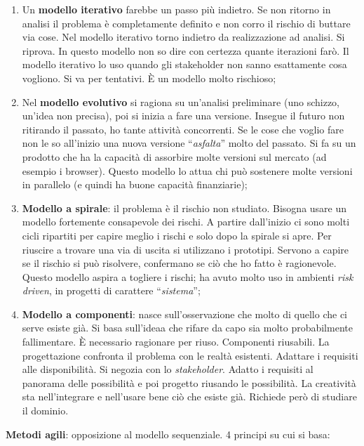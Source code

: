 \begin{enumerate}
	\item Un \textbf{modello iterativo} farebbe un passo più indietro. Se non ritorno in analisi il problema è completamente definito e non corro il rischio di buttare via cose. Nel modello iterativo torno indietro da realizzazione ad analisi. Si riprova. In questo modello non so dire con certezza quante iterazioni farò. Il modello iterativo lo uso quando gli stakeholder non sanno esattamente cosa vogliono. Si va per tentativi. È un modello molto rischioso;
	
	\item Nel \textbf{modello evolutivo} si ragiona su un'analisi preliminare (uno schizzo, un'idea non precisa), poi si inizia a fare una versione. Insegue il futuro non ritirando il passato, ho tante attività concorrenti. Se le cose che voglio fare non le so all'inizio una nuova versione ``\textit{asfalta}'' molto del passato. Si fa su un prodotto che ha la capacità di assorbire molte versioni sul mercato (ad esempio i browser). Questo modello lo attua chi può sostenere molte versioni in parallelo (e quindi ha buone capacità finanziarie);
	
	\item \textbf{Modello a spirale}: il problema è il rischio non studiato. Bisogna usare un modello fortemente consapevole dei rischi. A partire dall'inizio ci sono molti cicli ripartiti per capire meglio i rischi e solo dopo la spirale si apre. Per riuscire a trovare una via di uscita si utilizzano i prototipi. Servono a capire se il rischio si può risolvere, confermano se ciò che ho fatto è ragionevole. Questo modello aspira a togliere i rischi; ha avuto molto uso in ambienti \textit{risk driven}, in progetti di carattere ``\textit{sistema}'';
	
	\item \textbf{Modello a componenti}: nasce sull'osservazione che molto di quello che ci serve esiste già. Si basa sull'ideaa che rifare da capo sia molto probabilmente fallimentare. È necessario ragionare per riuso. Componenti riusabili. La progettazione confronta il problema con le realtà esistenti. Adattare i requisiti alle disponibilità. Si negozia con lo \textit{stakeholder}. Adatto i requisiti al panorama delle possibilità e poi progetto riusando le possibilità. La creatività sta nell'integrare e nell'usare bene ciò che esiste già. Richiede però di studiare il dominio.

\end{enumerate}

\textbf{Metodi agili}: opposizione al modello sequenziale. 4 principi su cui si basa:

